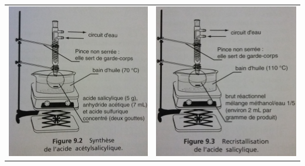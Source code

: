 \documentclass[11pt,a4paper]{report}
\begin{document}
\begin{center}
	\begin{tabular}{cc}
  		\includegraphics[scale = 0.1]{synthese_schema.jpg} &
   		\includegraphics[scale = 0.1]{recristallisation_schema.jpg} \\
	\end{tabular}
\end{center}
\end{document}
